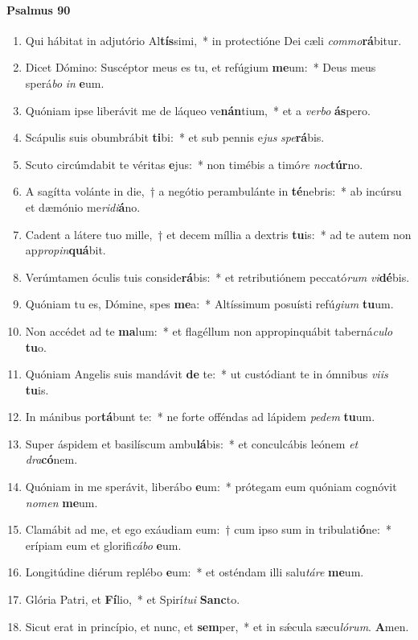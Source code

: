 \documentclass[twoside]{article}
\begin{document}
\begin{paracol}[1]{2}
\paragraph{Psalmus 90}
\begin{enumerate}[wide, itemsep=0mm, labelwidth=!, labelindent=0pt, label=\color{gregoriocolor}\theenumi]
\item Qui hábitat in adjutório Al\textbf{tís}simi,~* in protectióne Dei cæli \textit{com}\textit{mo}\textbf{rá}bitur.
\item Dicet Dómino: Suscéptor meus es tu, et refúgium \textbf{me}um:~* Deus meus sperá\textit{bo} \textit{in} \textbf{e}um.
\item Quóniam ipse liberávit me de láqueo ve\textbf{nán}tium,~* et a \textit{ver}\textit{bo} \textbf{ás}pero.
\item Scápulis suis obumbrábit \textbf{ti}bi:~* et sub pennis e\textit{jus} \textit{spe}\textbf{rá}bis.
\item Scuto circúmdabit te véritas \textbf{e}jus:~* non timébis a timó\textit{re} \textit{noc}\textbf{túr}no.
\item A sagítta volánte in die,~† a negótio perambulánte in \textbf{té}nebris:~* ab incúrsu et dæmónio me\textit{ri}\textit{di}\textbf{á}no.
\item Cadent a látere tuo mille,~† et decem míllia a dextris \textbf{tu}is:~* ad te autem non ap\textit{pro}\textit{pin}\textbf{quá}bit.
\item Verúmtamen óculis tuis conside\textbf{rá}bis:~* et retributiónem peccató\textit{rum} \textit{vi}\textbf{dé}bis.
\item Quóniam tu es, Dómine, spes \textbf{me}a:~* Altíssimum posuísti refú\textit{gi}\textit{um} \textbf{tu}um.
\item Non accédet ad te \textbf{ma}lum:~* et flagéllum non appropinquábit taberná\textit{cu}\textit{lo} \textbf{tu}o.
\item Quóniam Angelis suis mandávit \textbf{de} te:~* ut custódiant te in ómnibus \textit{vi}\textit{is} \textbf{tu}is.
\item In mánibus por\textbf{tá}bunt te:~* ne forte offéndas ad lápidem \textit{pe}\textit{dem} \textbf{tu}um.
\item Super áspidem et basilíscum ambu\textbf{lá}bis:~* et conculcábis leónem \textit{et} \textit{dra}\textbf{có}nem.
\item Quóniam in me sperávit, liberábo \textbf{e}um:~* prótegam eum quóniam cognóvit \textit{no}\textit{men} \textbf{me}um.
\item Clamábit ad me, et ego exáudiam eum:~† cum ipso sum in tribulati\textbf{ó}ne:~* erípiam eum et glorifi\textit{cá}\textit{bo} \textbf{e}um.
\item Longitúdine diérum replébo \textbf{e}um:~* et osténdam illi salu\textit{tá}\textit{re} \textbf{me}um.
\item Glória Patri, et \textbf{Fí}lio,~* et Spirí\textit{tu}\textit{i} \textbf{Sanc}to.
\item Sicut erat in princípio, et nunc, et \textbf{sem}per,~* et in sǽcula sæcu\textit{ló}\textit{rum}. \textbf{A}men.
\end{enumerate}
\switchcolumn


\end{paracol}
\end{document}
